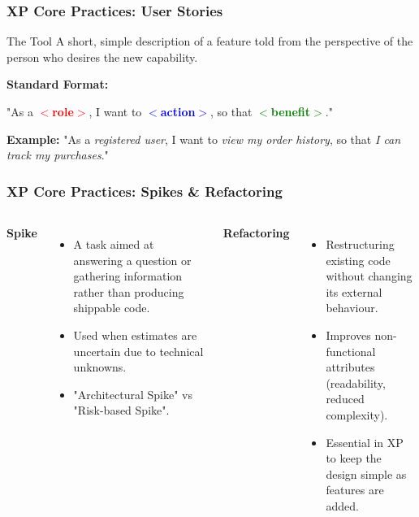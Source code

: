\documentclass[xcolor=table]{beamer}
\begin{document}
\begin{frame}
    \frametitle{XP Core Practices: User Stories}
    \begin{block}{The Tool}
        A short, simple description of a feature told from the perspective of the person who desires the new capability.
    \end{block}
    
    \vspace{0.5cm}
    \textbf{Standard Format:}
    \begin{center}
        \large "As a \textcolor{red}{\textbf{$<$role$>$}}, I want to \textcolor{blue}{\textbf{$<$action$>$}}, so that \textcolor{green}{\textbf{$<$benefit$>$}}."
    \end{center}
    
    \vspace{0.3cm}
    \textbf{Example:}
    "As a \textit{registered user}, I want to \textit{view my order history}, so that \textit{I can track my purchases}."
\end{frame}

\begin{frame}
    \frametitle{XP Core Practices: Spikes \& Refactoring}
    \begin{columns}
        \textbf{Spike}
        \begin{itemize}
            \item A task aimed at answering a question or gathering information rather than producing shippable code.
            \item Used when estimates are uncertain due to technical unknowns.
            \item "Architectural Spike" vs "Risk-based Spike".
        \end{itemize}

        \textbf{Refactoring}
        \begin{itemize}
            \item Restructuring existing code without changing its external behaviour.
            \item Improves non-functional attributes (readability, reduced complexity).
            \item Essential in XP to keep the design simple as features are added.
        \end{itemize}
    \end{columns}
\end{frame}
\end{document}
